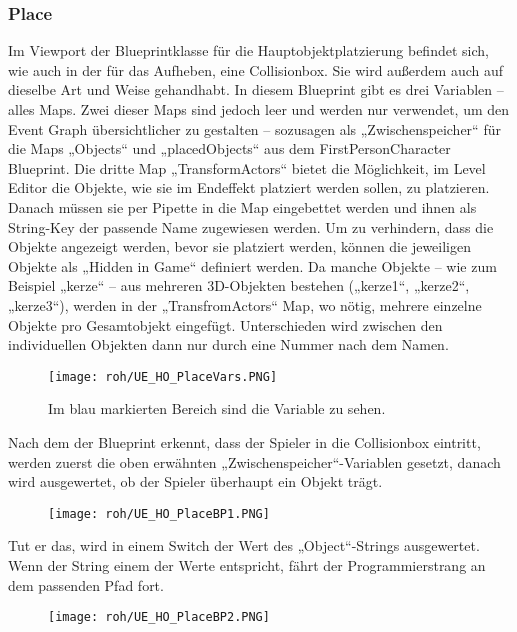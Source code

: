 \subsubsection{Place}
Im Viewport der Blueprintklasse für die Hauptobjektplatzierung befindet sich, wie auch in der für das Aufheben, eine Collisionbox. Sie wird außerdem auch auf dieselbe Art und Weise gehandhabt.
In diesem Blueprint gibt es drei Variablen – alles Maps. Zwei dieser Maps sind jedoch leer und werden nur verwendet, um den Event Graph übersichtlicher zu gestalten – sozusagen als „Zwischenspeicher“ für die Maps „Objects“ und „placedObjects“ aus dem FirstPersonCharacter Blueprint.
Die dritte Map „TransformActors“ bietet die Möglichkeit, im Level Editor die Objekte, wie sie im Endeffekt platziert werden sollen, zu platzieren. Danach müssen sie per Pipette in die Map eingebettet werden und ihnen als String-Key der passende Name zugewiesen werden. Um zu verhindern, dass die Objekte angezeigt werden, bevor sie platziert werden, können die jeweiligen Objekte als „Hidden in Game“ definiert werden.
Da manche Objekte – wie zum Beispiel „kerze“ – aus mehreren 3D-Objekten bestehen („kerze1“, „kerze2“, „kerze3“), werden in der „TransfromActors“ Map, wo nötig, mehrere einzelne Objekte pro Gesamtobjekt eingefügt. Unterschieden wird zwischen den individuellen Objekten dann nur durch eine Nummer nach dem Namen.
\begin{figure}[H]
    \centering
    \texttt{[image: roh/UE\_HO\_PlaceVars.PNG]}
    \caption{Im blau markierten Bereich sind die Variable zu sehen.}
    \label{UE:HO_PlaceVars}
\end{figure}
Nach dem der Blueprint erkennt, dass der Spieler in die Collisionbox eintritt, werden zuerst die oben erwähnten „Zwischenspeicher“-Variablen gesetzt, danach wird ausgewertet, ob der Spieler überhaupt ein Objekt trägt.
\begin{figure}[H]
    \centering
    \texttt{[image: roh/UE\_HO\_PlaceBP1.PNG]}
    \label{UE:HO_PlaceBP1}
\end{figure}
Tut er das, wird in einem Switch der Wert des „Object“-Strings ausgewertet. Wenn der String einem der Werte entspricht, fährt der Programmierstrang an dem passenden Pfad fort.
\begin{figure}[H]
    \centering
    \texttt{[image: roh/UE\_HO\_PlaceBP2.PNG]}
    \label{UE:HO_PlaceBP2_3_1}
\end{figure}

